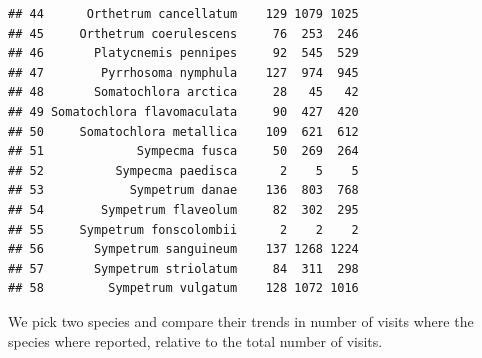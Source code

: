 \documentclass[
  10pt,
]{article}
\begin{document}
\begin{verbatim}
## 44      Orthetrum cancellatum    129 1079 1025
## 45     Orthetrum coerulescens     76  253  246
## 46       Platycnemis pennipes     92  545  529
## 47        Pyrrhosoma nymphula    127  974  945
## 48       Somatochlora arctica     28   45   42
## 49 Somatochlora flavomaculata     90  427  420
## 50     Somatochlora metallica    109  621  612
## 51             Sympecma fusca     50  269  264
## 52          Sympecma paedisca      2    5    5
## 53            Sympetrum danae    136  803  768
## 54        Sympetrum flaveolum     82  302  295
## 55     Sympetrum fonscolombii      2    2    2
## 56       Sympetrum sanguineum    137 1268 1224
## 57       Sympetrum striolatum     84  311  298
## 58         Sympetrum vulgatum    128 1072 1016
\end{verbatim}

We pick two species and compare their trends in number of visits where
the species where reported, relative to the total number of visits.
\end{document}
